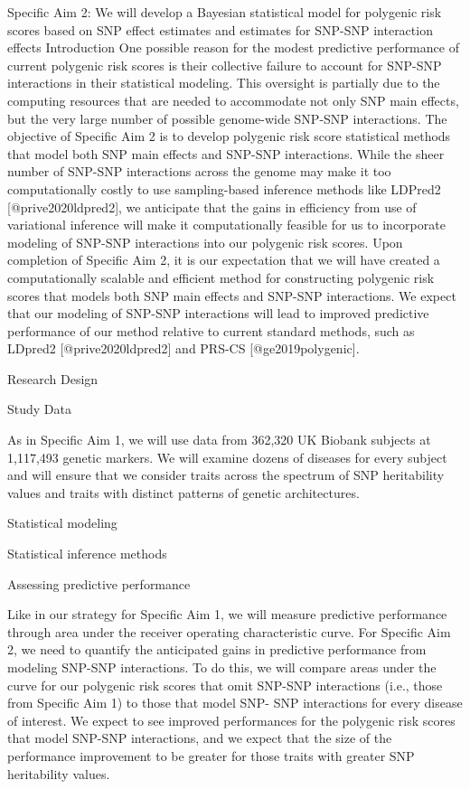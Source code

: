 \documentclass[
  letterpaper,
  DIV=11,
  numbers=noendperiod]{scrartcl}
\begin{document}
Specific Aim 2: We will develop a Bayesian statistical model for
polygenic risk scores based on SNP effect estimates and estimates for
SNP-SNP interaction effects Introduction One possible reason for the
modest predictive performance of current polygenic risk scores is their
collective failure to account for SNP-SNP interactions in their
statistical modeling. This oversight is partially due to the computing
resources that are needed to accommodate not only SNP main effects, but
the very large number of possible genome-wide SNP-SNP interactions. The
objective of Specific Aim 2 is to develop polygenic risk score
statistical methods that model both SNP main effects and SNP-SNP
interactions. While the sheer number of SNP-SNP interactions across the
genome may make it too computationally costly to use sampling-based
inference methods like LDPred2 {[}@prive2020ldpred2{]}, we anticipate
that the gains in efficiency from use of variational inference will make
it computationally feasible for us to incorporate modeling of SNP-SNP
interactions into our polygenic risk scores. Upon completion of Specific
Aim 2, it is our expectation that we will have created a computationally
scalable and efficient method for constructing polygenic risk scores
that models both SNP main effects and SNP-SNP interactions. We expect
that our modeling of SNP-SNP interactions will lead to improved
predictive performance of our method relative to current standard
methods, such as LDpred2 {[}@prive2020ldpred2{]} and PRS-CS
{[}@ge2019polygenic{]}.

Research Design

Study Data

As in Specific Aim 1, we will use data from 362,320 UK Biobank subjects
at 1,117,493 genetic markers. We will examine dozens of diseases for
every subject and will ensure that we consider traits across the
spectrum of SNP heritability values and traits with distinct patterns of
genetic architectures.

Statistical modeling

Statistical inference methods

Assessing predictive performance

Like in our strategy for Specific Aim 1, we will measure predictive
performance through area under the receiver operating characteristic
curve. For Specific Aim 2, we need to quantify the anticipated gains in
predictive performance from modeling SNP-SNP interactions. To do this,
we will compare areas under the curve for our polygenic risk scores that
omit SNP-SNP interactions (i.e., those from Specific Aim 1) to those
that model SNP- SNP interactions for every disease of interest. We
expect to see improved performances for the polygenic risk scores that
model SNP-SNP interactions, and we expect that the size of the
performance improvement to be greater for those traits with greater SNP
heritability values.
\end{document}

